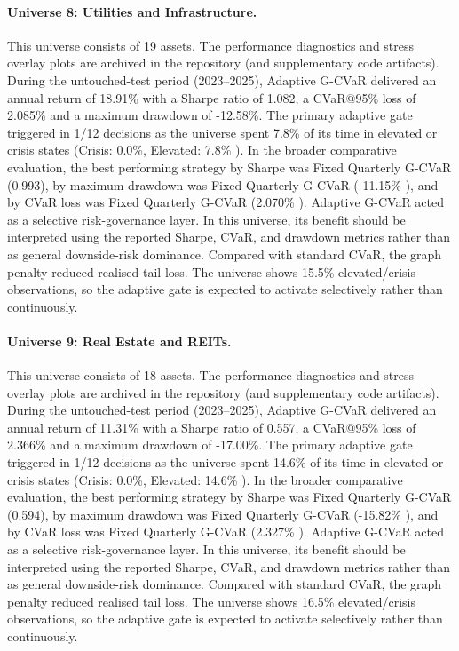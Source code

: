 \documentclass[11pt]{article}
\begin{document}
\paragraph{Universe 8: Utilities and Infrastructure.}
This universe consists of 19 assets. The performance diagnostics and stress overlay plots are archived in the repository (and supplementary code artifacts). During the untouched-test period (2023--2025), Adaptive G-CVaR delivered an annual return of 18.91\% with a Sharpe ratio of 1.082, a CVaR@95\% loss of 2.085\% and a maximum drawdown of -12.58\%. The primary adaptive gate triggered in 1/12 decisions as the universe spent 7.8\% of its time in elevated or crisis states (Crisis: 0.0\%, Elevated: 7.8\% ). In the broader comparative evaluation, the best performing strategy by Sharpe was Fixed Quarterly G-CVaR (0.993), by maximum drawdown was Fixed Quarterly G-CVaR (-11.15\% ), and by CVaR loss was Fixed Quarterly G-CVaR (2.070\% ). Adaptive G-CVaR acted as a selective risk-governance layer. In this universe, its benefit should be interpreted using the reported Sharpe, CVaR, and drawdown metrics rather than as general downside-risk dominance. Compared with standard CVaR, the graph penalty reduced realised tail loss. The universe shows 15.5\% elevated/crisis observations, so the adaptive gate is expected to activate selectively rather than continuously.

\paragraph{Universe 9: Real Estate and REITs.}
This universe consists of 18 assets. The performance diagnostics and stress overlay plots are archived in the repository (and supplementary code artifacts). During the untouched-test period (2023--2025), Adaptive G-CVaR delivered an annual return of 11.31\% with a Sharpe ratio of 0.557, a CVaR@95\% loss of 2.366\% and a maximum drawdown of -17.00\%. The primary adaptive gate triggered in 1/12 decisions as the universe spent 14.6\% of its time in elevated or crisis states (Crisis: 0.0\%, Elevated: 14.6\% ). In the broader comparative evaluation, the best performing strategy by Sharpe was Fixed Quarterly G-CVaR (0.594), by maximum drawdown was Fixed Quarterly G-CVaR (-15.82\% ), and by CVaR loss was Fixed Quarterly G-CVaR (2.327\% ). Adaptive G-CVaR acted as a selective risk-governance layer. In this universe, its benefit should be interpreted using the reported Sharpe, CVaR, and drawdown metrics rather than as general downside-risk dominance. Compared with standard CVaR, the graph penalty reduced realised tail loss. The universe shows 16.5\% elevated/crisis observations, so the adaptive gate is expected to activate selectively rather than continuously.
\end{document}
